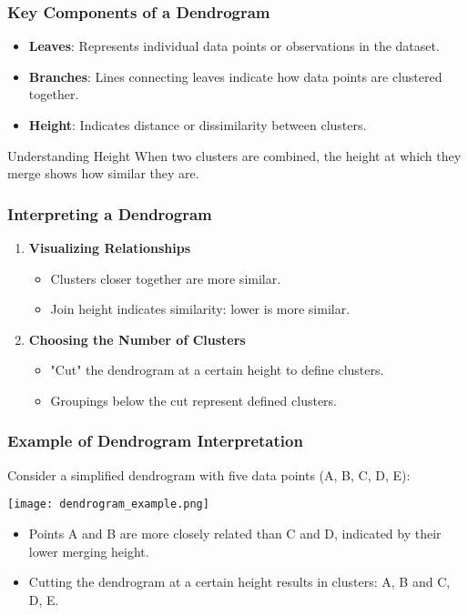 \documentclass[aspectratio=169]{beamer}
\begin{document}
\begin{frame}[fragile]
    \frametitle{Key Components of a Dendrogram}
    \begin{itemize}
        \item \textbf{Leaves}: Represents individual data points or observations in the dataset.
        \item \textbf{Branches}: Lines connecting leaves indicate how data points are clustered together.
        \item \textbf{Height}: Indicates distance or dissimilarity between clusters.
    \end{itemize}
    \begin{block}{Understanding Height}
        When two clusters are combined, the height at which they merge shows how similar they are.
    \end{block}
\end{frame}

\begin{frame}[fragile]
    \frametitle{Interpreting a Dendrogram}
    \begin{enumerate}
        \item \textbf{Visualizing Relationships}
            \begin{itemize}
                \item Clusters closer together are more similar.
                \item Join height indicates similarity: lower is more similar.
            \end{itemize}
        \item \textbf{Choosing the Number of Clusters}
            \begin{itemize}
                \item "Cut" the dendrogram at a certain height to define clusters.
                \item Groupings below the cut represent defined clusters.
            \end{itemize}
    \end{enumerate}
\end{frame}

\begin{frame}[fragile]
    \frametitle{Example of Dendrogram Interpretation}
    Consider a simplified dendrogram with five data points (A, B, C, D, E):
    
    \begin{center}
    \texttt{[image: dendrogram\_example.png]} %
    \end{center}

    \begin{itemize}
        \item Points A and B are more closely related than C and D, indicated by their lower merging height.
        \item Cutting the dendrogram at a certain height results in clusters: {A, B} and {C, D, E}.
    \end{itemize}
\end{frame}
\end{document}
